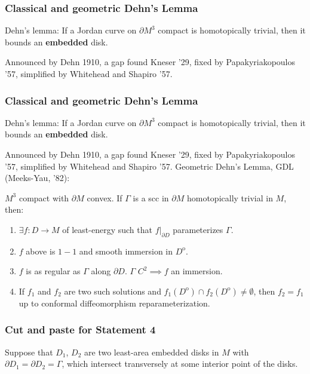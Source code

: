 \documentclass[t]{beamer}
\begin{document}

\begin{frame}
	\frametitle{Classical and geometric Dehn's Lemma}
	Dehn's lemma: If a Jordan curve on $\partial M^3$ compact is homotopically trivial, then it bounds an \textbf{embedded} disk. \par 
	Announced by Dehn 1910, a gap found Kneser '29, fixed by Papakyriakopoulos '57, simplified by Whitehead and Shapiro '57. 
\end{frame}

\begin{frame}
	\frametitle{Classical and geometric Dehn's Lemma}
Dehn's lemma: If a Jordan curve on $\partial M^3$ compact is homotopically trivial, then it bounds an \textbf{embedded} disk. \par 
Announced by Dehn 1910, a gap found Kneser '29, fixed by Papakyriakopoulos '57, simplified by Whitehead and Shapiro '57. 
\vfill
Geometric Dehn's Lemma, GDL (Meeks-Yau, '82): \par 
$M^3$ compact with $\partial M$ convex. If $\Gamma$ is a scc in $\partial M$ homotopically trivial in $M$, then: 
\begin{enumerate}
	\item $\exists f: D\rightarrow M$ of least-energy such that $f|_{\partial D}$ parameterizes $\Gamma$.
	\item $f$ above is $1-1$ and smooth immersion in $D^\mathrm{o}$. 
	\item $f$ is as regular as $\Gamma$ along $\partial D$. $\Gamma$ $C^2 \implies f$ an immersion. 
	\item If $f_1$ and $f_2$ are two such solutions and $f_1(D^\mathrm{o}) \cap f_2(D^\mathrm{o}) \neq \emptyset$, then $f_2=f_1$ up to conformal diffeomorphism reparameterization. 
\end{enumerate}
\end{frame}

\begin{frame}
	\frametitle{Cut and paste for Statement 4}
	Suppose that $D_1$, $D_2$ are two
	least-area embedded disks in $M$ with $\partial D_1 = \partial D_2 = \Gamma$, which intersect transversely at some interior point of the disks.
\end{frame}
\end{document}
